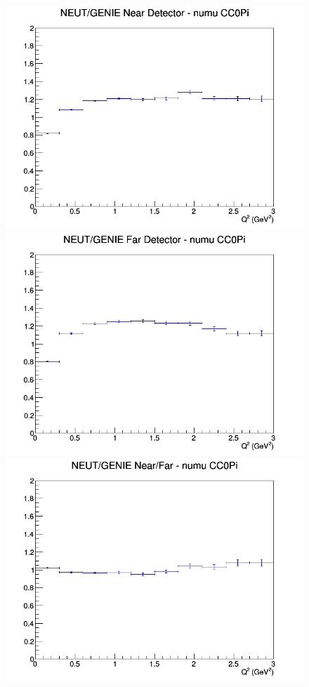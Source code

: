 \documentclass[12pt]{article}
\begin{document}
\begin{figure}[h]
\endminipage
\newline
{}
\includegraphics[width=\linewidth]{eff_Q2/GAr/ratios/CC0Pi_NEUT_GENIE_numu_near_Q2.png}
\endminipage
{}
\includegraphics[width=\linewidth]{eff_Q2/GAr/ratios/CC0Pi_NEUT_GENIE_numu_far_Q2.png}
\endminipage
{}
\includegraphics[width=\linewidth]{eff_Q2/GAr/ratios/CC0Pi_NEUT_GENIE_numu_NF_Q2.png}

\end{figure}
\end{document}
